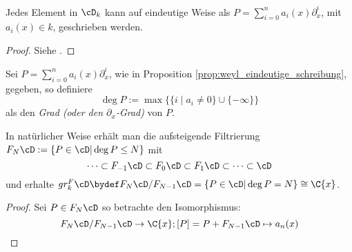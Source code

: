 \begin{prop} \label{prop:weyl_eindeutige_schreibung}
Jedes Element in $\cD_k$ kann auf eindeutige
Weise als $P=\sum_{i=0}^na_i(x)\partial_x^i$, mit $a_i(x)\in k$, geschrieben
werden.
\end{prop}
\begin{proof}
Siehe \cite[Proposition 1.2.3]{sabbah_cimpa90}.
\end{proof}
\begin{comment}
Gilt das folgende??
\[
\alpha_i(x)\partial_x^i \equiv \frac{\alpha_i}{x^i}(x\partial_x)^i \mod
F_{i-1}\cD
\]
\end{comment}

\begin{comment}
Besser?:\\
erst Filtrierung definieren und dadurch dann den Grad?
\end{comment}
\begin{defn}
Sei $P=\sum_{i=0}^na_i(x)\partial_x^i$, wie in Proposition
\ref{prop:weyl_eindeutige_schreibung}, gegeben, so definiere
\[
\deg P:=\max\Big\{\{i\mid a_i\neq 0\}\cup\{-\infty\}\Big\}
\]
als den \emph{Grad (oder den $\partial_x$-Grad)}
von $P$.
\end{defn}
\begin{comment}
Unabhängigkeit von Schreibung? Sabbah Script!
\end{comment}
In natürlicher Weise erhält man die aufsteigende Filtrierung
$F_N\cD:=\{P\in\cD|\deg P\leq N\}$ mit
\[
\cdots\subset F_{-1}\cD\subset F_{0}\cD\subset
F_{1}\cD\subset\cdots\subset\cD
\]
und erhalte $gr_k^F\cD\bydef F_N\cD\slash F_{N-1}\cD
=\{P\in\cD|\deg P=N\}\cong\C\{x\}$.

\begin{proof}
Sei $P\in F_N\cD$ so betrachte den Isomorphismus:
\[
F_N\cD\slash F_{N-1}\cD\rightarrow \C\{x\}; [P]=P+F_{N-1}\cD\mapsto a_n(x)
\]
\end{proof}

\begin{comment}
\begin{prop}
Es gilt:
\begin{center}
\begin{tikzpicture} [descr/.style={fill=white,inner sep=2.5pt}]
\matrix (m) [
  matrix of math nodes,
  row sep=1em,
  text height=1.5ex,
  text depth=0.25ex]
{
  gr^F\cD &
  := \bigoplus_{N\in\Z}gr_N^F\cD = \bigoplus_{N\in\N_0}gr_N^F\cD \cong
  \bigoplus_{N\in\N_0}\C\{x\} \cong \C\{x\}[\xi] = &
  \bigoplus_{N\in\N_0}\C\{x\}\cdot \xi^N \\
};
\path[solid]
(m-1-1) edge [bend right=15] node[descr]{$\cong$}
  node[below]{$\mbox{isomorph als grad. Ringe}$} (m-1-3);
\end{tikzpicture}
\end{center}
also $gr^F\cD \cong \bigoplus_{N\in\N_0}\C\{x\}\cdot \xi^N$ als graduierte
Ringe.
\end{prop}
\begin{proof}
TODO: Treffen?
\end{proof}
\end{comment}

